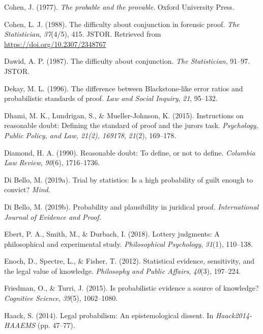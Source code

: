 \documentclass[10pt,dvipsnames,enabledeprecatedfontcommands]{scrartcl}
\begin{document}
\leavevmode\hypertarget{ref-Cohen1977The-probable-an}{}%
Cohen, J. (1977). \emph{The probable and the provable}. Oxford
University Press.

\leavevmode\hypertarget{ref-cohen1988difficulty}{}%
Cohen, L. J. (1988). The difficulty about conjunction in forensic proof.
\emph{The Statistician}, \emph{37}(4/5), 415. JSTOR. Retrieved from
\url{https://doi.org/10.2307/2348767}

\leavevmode\hypertarget{ref-dawid1987difficulty}{}%
Dawid, A. P. (1987). The difficulty about conjunction. \emph{The
Statistician}, 91--97. JSTOR.

\leavevmode\hypertarget{ref-Dekay1996}{}%
Dekay, M. L. (1996). The difference between Blackstone-like error ratios
and probabilistic standards of proof. \emph{Law and Social Inquiry},
\emph{21}, 95--132.

\leavevmode\hypertarget{ref-dhamiEtAl2015}{}%
Dhami, M. K., Lundrigan, S., \& Mueller-Johnson, K. (2015). Instructions
on reasonable doubt: Defining the standard of proof and the jurors task.
\emph{Psychology, Public Policy, and Law, 21(2), 169178}, \emph{21}(2),
169--178.

\leavevmode\hypertarget{ref-diamond90}{}%
Diamond, H. A. (1990). Reasonable doubt: To define, or not to define.
\emph{Columbia Law Review}, \emph{90}(6), 1716--1736.

\leavevmode\hypertarget{ref-diBello2019}{}%
Di Bello, M. (2019a). Trial by statistics: Is a high probability of
guilt enough to convict? \emph{Mind}.

\leavevmode\hypertarget{ref-DiBello2019plausibility}{}%
Di Bello, M. (2019b). Probability and plausibility in juridical proof.
\emph{International Journal of Evidence and Proof}.

\leavevmode\hypertarget{ref-ebert2018}{}%
Ebert, P. A., Smith, M., \& Durbach, I. (2018). Lottery judgments: A
philosophical and experimental study. \emph{Philosophical Psychology},
\emph{31}(1), 110--138.

\leavevmode\hypertarget{ref-Enoch2012Statistical}{}%
Enoch, D., Spectre, L., \& Fisher, T. (2012). Statistical evidence,
sensitivity, and the legal value of knowledge. \emph{Philosophy and
Public Affairs}, \emph{40}(3), 197--224.

\leavevmode\hypertarget{ref-friedman2015}{}%
Friedman, O., \& Turri, J. (2015). Is probabilistic evidence a source of
knowledge? \emph{Cognitive Science}, \emph{39}(5), 1062--1080.

\leavevmode\hypertarget{ref-haack2011legal}{}%
Haack, S. (2014). Legal probabilism: An epistemological dissent. In
\emph{Haack2014-HAAEMS} (pp. 47--77).
\end{document}
